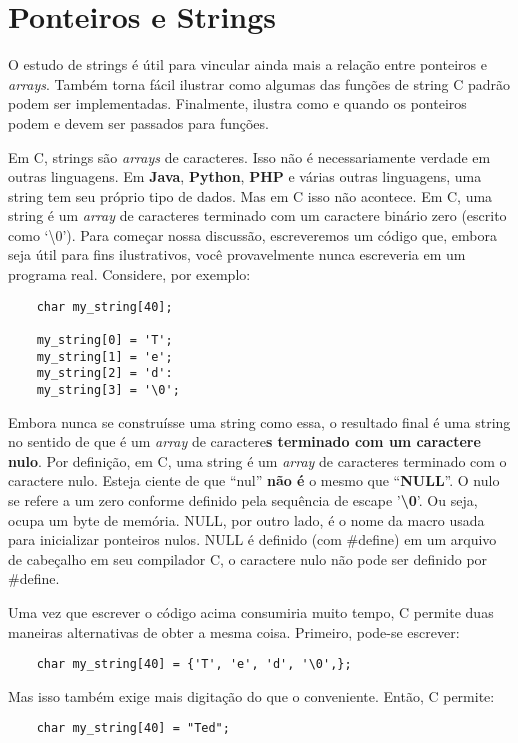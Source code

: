 
\chapter{Ponteiros e Strings}
O estudo de strings é útil para vincular ainda mais a relação entre ponteiros e \textit{arrays}. Também torna fácil ilustrar como algumas das funções de string C padrão podem ser implementadas. Finalmente, ilustra como e quando os ponteiros podem e devem ser passados para funções.

Em C, strings são \textit{arrays} de caracteres. Isso não é necessariamente verdade em outras linguagens. Em \textbf{Java}, \textbf{Python}, \textbf{PHP} e várias outras linguagens, uma string tem seu próprio tipo de dados. Mas em C isso não acontece. Em C, uma string é um \textit{array} de caracteres terminado com um caractere binário zero (escrito como `\textbackslash0'). Para começar nossa discussão, escreveremos um código que, embora seja útil para fins ilustrativos, você provavelmente nunca escreveria em um programa real. Considere, por exemplo:
\begin{lstlisting}
	char my_string[40];
	
	my_string[0] = 'T';
	my_string[1] = 'e';
	my_string[2] = 'd':
	my_string[3] = '\0';
\end{lstlisting}

Embora nunca se construísse uma string como essa, o resultado final é uma string no sentido de que é um \textit{array} de caractere\textbf{s terminado com um caractere nulo}. Por definição, em C, uma string é um \textit{array} de caracteres terminado com o caractere nulo. Esteja ciente de que ``nul'' \textbf{não é} o mesmo que ``\textbf{NULL}''. O nulo se refere a um zero conforme definido pela sequência de escape '\textbf{\textbackslash0}'. Ou seja, ocupa um byte de memória. NULL, por outro lado, é o nome da macro usada para inicializar ponteiros nulos. NULL é definido (com \#define) em um arquivo de cabeçalho em seu compilador C, o caractere nulo não pode ser definido por \#define.

Uma vez que escrever o código acima consumiria muito tempo, C permite duas maneiras alternativas de obter a mesma coisa. Primeiro, pode-se escrever:
\begin{lstlisting}
	char my_string[40] = {'T', 'e', 'd', '\0',};
\end{lstlisting}

Mas isso também exige mais digitação do que o conveniente. Então, C permite:
\begin{lstlisting}
	char my_string[40] = "Ted";
\end{lstlisting}

